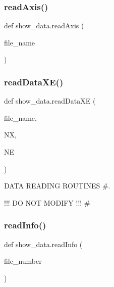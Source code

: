 \mbox{\label{namespaceshow__data_ab1b09a72c8a889095ad5231f164de37b}} 
\subsubsection{\texorpdfstring{read\+Axis()}{readAxis()}}
{\footnotesize\ttfamily def show\+\_\+data.\+read\+Axis (\begin{DoxyParamCaption}\item[{}]{file\+\_\+name }\end{DoxyParamCaption})}

\mbox{\label{namespaceshow__data_ae04ae714cdb070ab5d3340f1a068c9b5}} 
\subsubsection{\texorpdfstring{read\+Data\+X\+E()}{readDataXE()}}
{\footnotesize\ttfamily def show\+\_\+data.\+read\+Data\+XE (\begin{DoxyParamCaption}\item[{}]{file\+\_\+name,  }\item[{}]{NX,  }\item[{}]{NE }\end{DoxyParamCaption})}



D\+A\+TA R\+E\+A\+D\+I\+NG R\+O\+U\+T\+I\+N\+ES \#. 

!!! DO N\+OT M\+O\+D\+I\+FY !!! \# \mbox{\label{namespaceshow__data_aab5be823cbbc61ae5b19de227cc9ed56}} 
\subsubsection{\texorpdfstring{read\+Info()}{readInfo()}}
{\footnotesize\ttfamily def show\+\_\+data.\+read\+Info (\begin{DoxyParamCaption}\item[{}]{file\+\_\+number }\end{DoxyParamCaption})}

